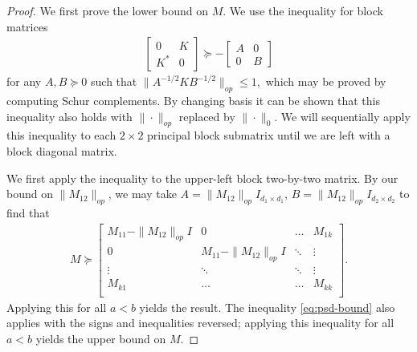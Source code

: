 \documentclass[aos]{imsart}
\theoremstyle{definition}
\numberwithin{equation}{section}
\newcommand{\rv}{X}
\begin{document}
\begin{proof}
We first prove the lower bound on $M$. We use the inequality for block matrices
\begin{align}\begin{bmatrix} 0 & K \\ K^{*} & 0 \end{bmatrix} \succeq - \begin{bmatrix} A & 0 \\ 0 & B \end{bmatrix}\label{eq:psd-bound}\end{align} for any $A,B \succeq 0$ such that $\|A^{-1/2} K B^{-1/2}\|_{op} \leq 1,$ which may be proved by computing Schur complements. By changing basis it can be shown that this inequality also holds with $\| \cdot \|_{op}$ replaced by $\|\cdot\|_0$. We will sequentially apply this inequality to each $2\times 2$ principal block submatrix until we are left with a block diagonal matrix. 

We first apply the inequality to the upper-left block two-by-two matrix. By our bound on $\|M_{12}\|_{op}$, we may take
   $A = \|M_{12}\|_{op} I_{d_1\times d_1}$, $B = \|M_{12}\|_{op} I_{d_2\times d_2}$ to find that
   \begin{align*}
M \succeq \begin{bmatrix}
M_{11}-  \|M_{12}\|_{op} I & 0 & \hdots &  M_{1k} \\
0 & M_{11} - \|M_{12}\|_{op} I & \ddots & \vdots \\
\vdots & \ddots & \ddots & \vdots\\
M_{k1} & \hdots &  \hdots & M_{kk}\\
  \end{bmatrix}.\end{align*}
 Applying this for all $a < b$ yields the result. The inequality \cref{eq:psd-bound} also applies with the signs and inequalities reversed; applying this inequality for all $a < b$ yields the upper bound on $M$. \end{proof}
 
\end{document}
